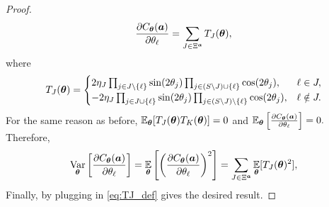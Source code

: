 \documentclass{article}
\theoremstyle{plain}
\theoremstyle{definition}
\theoremstyle{remark}
\begin{document}
\begin{proof}
\begin{equation*}
\frac{\partial C_{\bm{\theta}}({\bm{a}})}{\partial\theta_\ell}
=
\sum_{J\in\Xi^{\bm{a}}} T_J({\bm{\theta}}),
\end{equation*}
where
\begin{equation*}
T_J({\bm{\theta}})
=
\begin{cases}
2 \eta_J\prod_{j\in J\setminus\{\ell\}}\sin(2\theta_j)\prod_{j\in (S\setminus J) \cup \{\ell\}}\cos(2\theta_j), & \ell\in J,\\
-2 \eta_J \prod_{j\in J\cup \{\ell \}}\sin(2\theta_j)\prod_{j\in (S\setminus J)\setminus\{\ell\}}\cos(2\theta_j), & \ell\notin J.
\end{cases}
\label{eq:TJ_def}
\end{equation*}
For the same reason as before, $\operatorname*{\mathbb{E}}_{{\bm{\theta}}}[T_J({\bm{\theta}})T_K({\bm{\theta}})] = 0 $ and  $\operatorname*{\mathbb{E}}_{{\bm{\theta}}} \left[ \frac{\partial C_{\bm{\theta}}({\bm{a}})}{\partial\theta_\ell}\right] = 0.$
Therefore,
\begin{equation*}
\operatorname*{Var}_{{\bm{\theta}}}\left[\frac{\partial C_{\bm{\theta}}({\bm{a}})}{\partial\theta_\ell}\right]
=
\operatorname*{\mathbb{E}}_{{\bm{\theta}}}\left[\left(\frac{\partial C_{\bm{\theta}}({\bm{a}})}{\partial\theta_\ell}\right)^2\right]
=
\sum_{J\in \Xi^{\bm{a}}}\operatorname*{\mathbb{E}}_{{\bm{\theta}}}[T_J({\bm{\theta}})^2],
\label{eq: symmetric derivative variance}
\end{equation*}
Finally, by plugging in \cref{eq:TJ_def} gives the desired result.
\end{proof}
\end{document}
